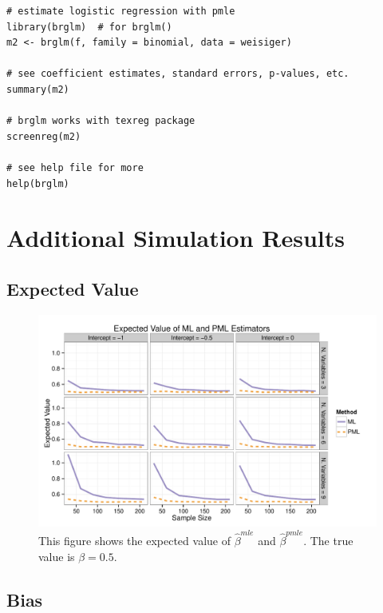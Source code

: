 \documentclass[12pt]{article}
\begin{document}
\begin{appendix}
\begin{footnotesize}
\begin{verbatim}
# estimate logistic regression with pmle
library(brglm)  # for brglm()
m2 <- brglm(f, family = binomial, data = weisiger)

# see coefficient estimates, standard errors, p-values, etc.
summary(m2)

# brglm works with texreg package
screenreg(m2)

# see help file for more
help(brglm)
\end{verbatim}
\end{footnotesize}

\section{Additional Simulation Results}\label{sec:app-sims}

\subsection{Expected Value}

\begin{figure}[H]
\begin{center}
\includegraphics[width = \textwidth]{figs/sims-ev.pdf}
\caption{This figure shows the expected value of $\hat{\beta}^{mle}$ and $\hat{\beta}^{pmle}$. The true value is $\beta = 0.5$.}\label{fig:ev}
\end{center}
\end{figure}

\subsection{Bias}


\end{appendix}
\end{document}
